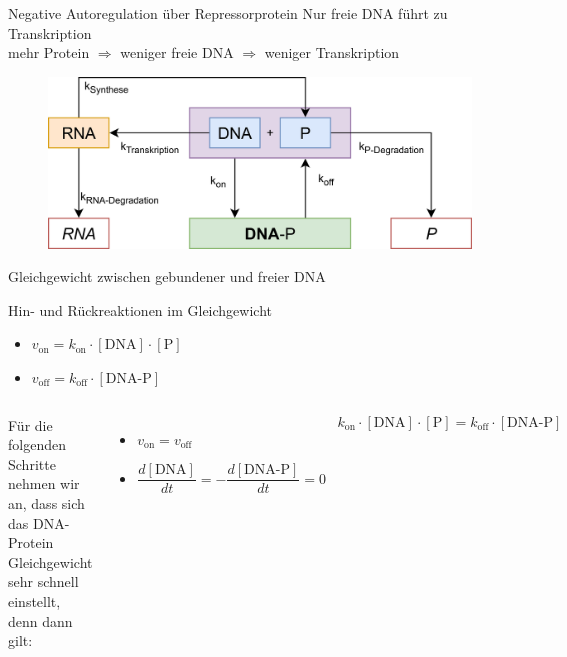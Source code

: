 \documentclass[11pt,aspectratio=169,reqno]{beamer}
\begin{document}
\begin{frame}{Negative Autoregulation über Repressorprotein}
    \centering Nur freie DNA führt zu Transkription\\ 
    mehr Protein $\Rightarrow$ weniger freie DNA $\Rightarrow$ weniger Transkription

    \begin{figure}
        \centering
        \includegraphics[width=.6\textwidth]{images/negative_autoregulation_overview.png}
    \end{figure}
\end{frame}

\begin{frame}{Gleichgewicht zwischen gebundener und freier DNA}

    Hin- und Rückreaktionen im Gleichgewicht
    \begin{itemize}
        \item $v_\text{on}=k_\text{on}\cdot [\text{DNA}]\cdot [\text{P}]$
        \item $v_\text{off}=k_\text{off}\cdot [\text{DNA-P}]$\pause
    \end{itemize}

    \vspace{1.5em}

    \begin{columns}[onlytextwidth]
    Für die folgenden Schritte nehmen wir an, dass sich das DNA-Protein Gleichgewicht sehr schnell einstellt, denn dann gilt:
    \begin{itemize}
        \item $v_\text{on}=v_\text{off}$\\[8pt]
        \item $\dfrac{d[\text{DNA}]}{dt}=-\dfrac{d[\text{DNA-P}]}{dt}=0$\\[8pt]
    \end{itemize}
    \[k_\text{on}\cdot [\text{DNA}]\cdot [\text{P}]=k_\text{off}\cdot [\text{DNA-P}]\]
    \end{columns}
\end{frame}
\end{document}
